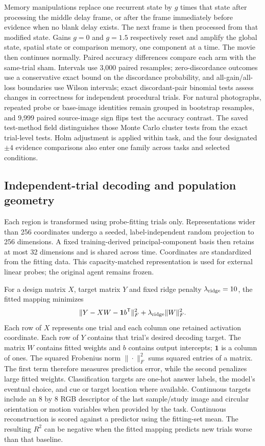 \documentclass[11pt]{article}
\begin{document}
Memory manipulations replace one recurrent state by $g$ times that state after processing the middle delay frame, or after the frame immediately before evidence when no blank delay exists. The next frame is then processed from that modified state. Gains $g=0$ and $g=1.5$ respectively reset and amplify the global state, spatial state or comparison memory, one component at a time. The movie then continues normally. Paired accuracy differences compare each arm with the same-trial sham. Intervals use 3,000 paired resamples; zero-discordance outcomes use a conservative exact bound on the discordance probability, and all-gain/all-loss boundaries use Wilson intervals; exact discordant-pair binomial tests assess changes in correctness for independent procedural trials. For natural photographs, repeated probe or base-image identities remain grouped in bootstrap resamples, and 9,999 paired source-image sign flips test the accuracy contrast. The saved test-method field distinguishes those Monte Carlo cluster tests from the exact trial-level tests. Holm adjustment is applied within task, and the four designated $\pm4$ evidence comparisons also enter one family across tasks and selected conditions.

\subsection{Independent-trial decoding and population geometry}
Each region is transformed using probe-fitting trials only. Representations wider than 256 coordinates undergo a seeded, label-independent random projection to 256 dimensions. A fixed training-derived principal-component basis then retains at most 32 dimensions and is shared across time. Coordinates are standardized from the fitting data. This capacity-matched representation is used for external linear probes; the original agent remains frozen.

For a design matrix $X$, target matrix $Y$ and fixed ridge penalty $\lambda_{\rm ridge}=10$, the fitted mapping minimizes
\begin{equation}
 \|Y-XW-\mathbf 1 b^{\mathsf T}\|_F^2+\lambda_{\rm ridge}\|W\|_F^2.
\end{equation}
Each row of $X$ represents one trial and each column one retained activation coordinate. Each row of $Y$ contains that trial's desired decoding target. The matrix $W$ contains fitted weights and $b$ contains output intercepts; $\mathbf 1$ is a column of ones. The squared Frobenius norm $\|\cdot\|_F^2$ sums squared entries of a matrix. The first term therefore measures prediction error, while the second penalizes large fitted weights. Classification targets are one-hot answer labels, the model's eventual choice, and cue or target location where available. Continuous targets include an 8 by 8 RGB descriptor of the last sample/study image and circular orientation or motion variables when provided by the task. Continuous reconstruction is scored against a predictor using the fitting-set mean. The resulting $R^2$ can be negative when the fitted mapping predicts new trials worse than that baseline.
\end{document}
